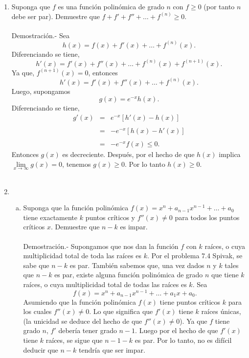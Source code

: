 \begin{enumerate}[\bfseries 1.]
    \item Suponga que $f$ es una función polinómica de grado $n$ con $f\geq 0$ (por tanto $n$ debe ser par). Demuestre que $f+f'+f''+\ldots + f^{(n)}\geq 0.$\\\\
	Demostración.-\; Sea 
	$$h(x)=f(x)+f'(x)+\ldots + f^{(n)}(x).$$
	Diferenciando se tiene,
	$$h'(x)=f'(x)+f''(x)+\ldots + f^{(n)}(x)+f^{(n+1)}(x).$$
	Ya que, $f^{(n+1)}(x)=0$, entonces
	$$h'(x)=f'(x)+f''(x)+\ldots + f^{(n)}(x).$$
	Luego, supongamos
	$$g(x)=e^{-x}h(x).$$
	Diferenciando se tiene,
	$$\begin{array}{rcl}
	    g'(x)&=&e^{-x}\left[h'(x)-h(x)\right]\\\\
		 &=&-e^{-x}\left[h(x)-h'(x)\right]\\\\
		 &=&-e^{-x}f(x)\leq 0.
	\end{array}$$
	Entonces $g(x)$ es decreciente. Después, por el hecho de que $h(x)$ implica $\lim\limits_{x\to \infty} g(x)=0$, tenemos $g(x)\geq 0$. Por lo tanto $h(x)\geq 0$.\\\\

    \item 
	\begin{enumerate}[(a)]

	    \item Suponga que la función polinómica $f(x)=x^n+a_{n-1}x^{n-1}+\ldots + a_0$ tiene exactamente $k$ puntos críticos y $f''(x)\neq 0$ para todos los puntos críticos $x$. Demuestre que $n-k$ es impar.\\\\
		Demostración.-\; Supongamos que nos dan la función $f$ con $k$ raíces, o cuya multiplicidad total de toda las raíces es $k$. Por el problema 7.4 Spivak, se sabe que $n-k$ es par. También sabemos que, una vez dados $n$ y $k$ tales que $n-k$ es par, existe alguna función polinómica de grado $n$ que tiene $k$ raíces, o cuya multiplicidad total de todas las raíces es $k$. Sea 
		$$f(x)=x^n+a_{n-1}x^{n-1}+\ldots + a_1x+a_0.$$
		Asumiendo que la función polinómica $f(x)$ tiene puntos críticos $k$  para los cuales $f''(x)\neq 0$. Lo que significa que $f'(x)$ tiene $k$ raíces únicas, (la unicidad se deduce del hecho de que $f''(x)\neq 0$). Ya que $f$ tiene grado $n$, $f'$ debería tener grado $n-1$. Luego por el hecho de que $f'(x)$ tiene $k$ raíces, se sigue que $n-1-k$ es par. Por lo tanto, no es difícil deducir que $n-k$ tendría que ser impar. \\\\


\end{enumerate}
\end{enumerate}
